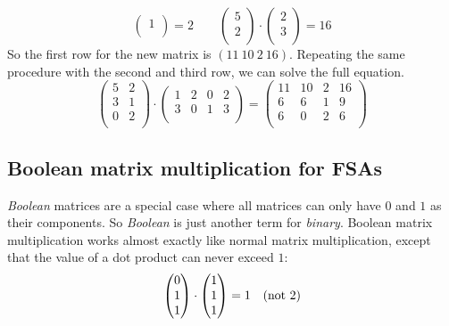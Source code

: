 \begin{examplebox}
\[\begin{pmatrix}
            1\\
        \end{pmatrix}
        =
        2
        \qquad
        \begin{pmatrix}
            5\\
            2\\
        \end{pmatrix}
        \cdot
        \begin{pmatrix}
            2\\
            3\\
        \end{pmatrix}
        =
        16
    \]
    So the first row for the new matrix is $(11\ 10\ 2\ 16)$.
    Repeating the same procedure with the second and third row, we can solve the full equation.
    \[
        \begin{pmatrix}
            5 & 2\\
            3 & 1\\
            0 & 2\\
        \end{pmatrix}
        \cdot
        \begin{pmatrix}
            1 & 2 & 0 & 2\\
            3 & 0 & 1 & 3\\
        \end{pmatrix}
        =
        \begin{pmatrix}
            11 & 10 & 2 & 16\\
            6 & 6 & 1 & 9\\
            6 & 0 & 2 & 6\\
        \end{pmatrix}
    \]
\end{examplebox}

\subsection*{Boolean matrix multiplication for FSAs}%
\label{sub:matrix_boolean}

\emph{Boolean} matrices are a special case where all matrices can only have $0$ and $1$ as their components.
So \emph{Boolean} is just another term for \emph{binary}.
Boolean matrix multiplication works almost exactly like normal matrix multiplication, except that the value of a dot product can never exceed $1$:
\[
    \begin{pmatrix}
        0\\1\\1
    \end{pmatrix}
    \cdot
    \begin{pmatrix}
        1\\1\\1
    \end{pmatrix}
    =
    1
    \text{\quad (not 2)}
\]

